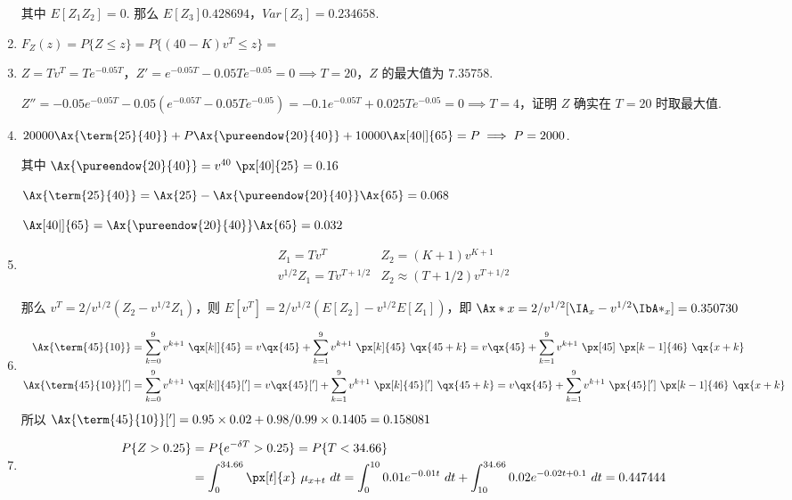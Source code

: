 \documentclass[utf8]{ctexart}
\def\lt{<}
\def\gt{>}
\begin{document}
\begin{enumerate}
    其中 $E[Z_{1}Z_{2}] = 0$. 那么 $E[Z_{3}] 0.428694$，$Var[Z_{3}] = 0.234658$.

    \item $F_{Z}(z) = P\{Z\le z\} = P\{(40-K)v^{T}\le z\} = $

    \item $Z = Tv^{T} = Te^{-0.05T}$，$Z' = e^{-0.05T} - 0.05Te^{-0.05} = 0\implies T = 20$，$Z$ 的最大值为 $7.35758$.

    $Z'' = -0.05e^{-0.05T} - 0.05(e^{-0.05T} - 0.05Te^{-0.05}) = -0.1e^{-0.05T} + 0.025Te^{-0.05} = 0\implies T = 4$，证明 $Z$ 确实在 $T=20$ 时取最大值.

    \item $20000\Ax{\term{25}{40}} + P\Ax{\pureendow{20}{40}} + 10000\Ax[40|]{65} = P\implies P = 2000$.

    其中 $\Ax{\pureendow{20}{40}} = v^{40}~\px[40]{25} = 0.16$

    $\Ax{\term{25}{40}} = \Ax{25} - \Ax{\pureendow{20}{40}}\Ax{65} = 0.068$

    $\Ax[40|]{65} = \Ax{\pureendow{20}{40}}\Ax{65} = 0.032$

    \item $$\begin{array}{ll}
        Z_{1} = Tv^{T} & Z_{2} = (K+1)v^{K+1}\\
        v^{1/2}Z_{1} = Tv^{T+1/2} & Z_{2}\approx (T+1/2)v^{T+1/2}
    \end{array}$$

    那么 $v^{T} = 2/v^{1/2}(Z_{2}-v^{1/2}Z_{1})$，则 $E[v^{T}] =  2/v^{1/2}(E[Z_{2}]-v^{1/2}E[Z_{1}])$，即 $\Ax*{x} = 2/v^{1/2}[\IA_{x}-v^{1/2}\IbA*_{x}] = 0.350730$

    \item \begin{align*}
        \Ax{\term{45}{10}} & = \sum_{k=0}^{9} v^{k+1}~\qx[k|]{45} = v\qx{45} + \sum_{k=1}^{9} v^{k+1}~\px[k]{45}~\qx{45+k} = v\qx{45} + \sum_{k=1}^{9} v^{k+1}~\px[45]~\px[k-1]{46}~\qx{x+k}\\
        \Ax{\term{45}{10}}['] & = \sum_{k=0}^{9} v^{k+1}~\qx[k|]{45}['] = v\qx{45}['] + \sum_{k=1}^{9} v^{k+1}~\px[k]{45}[']~\qx{45+k} = v\qx{45} + \sum_{k=1}^{9} v^{k+1}~\px{45}[']~\px[k-1]{46}~\qx{x+k}
    \end{align*}
    所以 $\Ax{\term{45}{10}}['] = 0.95\times 0.02 + 0.98/0.99\times 0.1405 = 0.158081$

    \item \begin{align*}
    P\{Z\gt 0.25\} & = P\{e^{-\delta T}\gt 0.25\} = P\{T\lt 34.66\}\\
    & = \int_{0}^{34.66} \px[t]{x}~\mu_{x+t}~dt = \int_{0}^{10} 0.01e^{-0.01t}~dt + \int_{10}^{34.66} 0.02e^{-0.02t+0.1}~dt = 0.447444
    \end{align*}


\end{enumerate}
\end{document}
